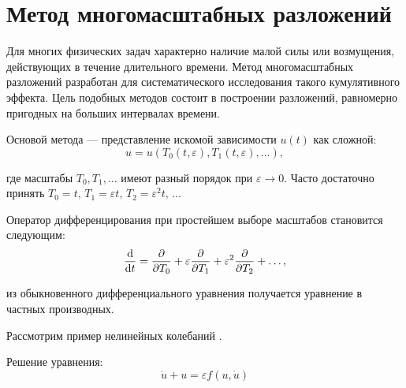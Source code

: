 \chapter*{Метод многомасштабных разложений}

Для многих физических задач характерно
наличие малой силы или возмущения,
действующих в течение длительного времени.
Метод многомасштабных разложений разработан
для систематического исследования
такого кумулятивного эффекта.
Цель подобных методов состоит
в построении разложений,
равномерно пригодных на больших интервалах времени.
\cite{coul1972}

Основой метода --- представление
искомой зависимости $u(t)$ как сложной:
\begin{equation*}
    u = u(T_0(t, \varepsilon), T_1(t, \varepsilon), \dots),
\end{equation*}

где масштабы $T_0, T_1, \dots$
имеют разный порядок при $\varepsilon \to 0$.
Часто достаточно принять
$T_0 = t, \, T_1 = \varepsilon t, \, T_2 = \varepsilon^2 t, \, \dots$

Оператор дифференцирования при простейшем выборе масштабов
становится следующим:
\begin{equation*}
    \dv{}{t} = \pdv{}{T_0} + \varepsilon \pdv{}{T_1} +
    \varepsilon^2 \pdv{}{T_2} + \dots,
\end{equation*}

из обыкновенного дифференциального уравнения
получается уравнение в частных производных.

Рассмотрим пример нелинейных колебаний \cite{eliseev1999}.

Решение уравнения:
\begin{equation*}
    \ddot{u} + u = \varepsilon f(u, \dot{u})
\end{equation*}



